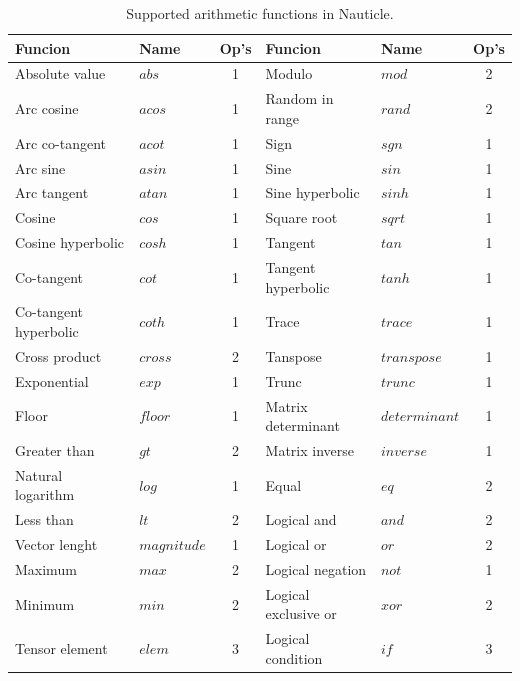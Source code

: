\documentclass[a4paper,12pt,openany]{book}
\theoremstyle{break}
\begin{document}
\begin{table}
\begin{center}
\caption{Supported arithmetic functions in Nauticle.}\label{tbl:arfc}
\begin{tabular}{ l l c | l l c }
\toprule[1.5pt]
\bf Funcion & \bf Name & \bf Op's & \bf Funcion & \bf Name & \bf Op's\\ 
\midrule
Absolute value & $abs$ & 1 & Modulo & $mod$ & 2 \\
Arc cosine & $acos$ & 1 & Random in range & $rand$ & 2 \\
Arc co-tangent & $acot$ & 1 & Sign & $sgn$ & 1 \\
Arc sine & $asin$ & 1 & Sine & $sin$ & 1 \\
Arc tangent & $atan$ & 1 & Sine hyperbolic & $sinh$ & 1 \\
Cosine & $cos$ & 1 & Square root & $sqrt$ & 1 \\
Cosine hyperbolic & $cosh$ & 1 & Tangent & $tan$ & 1 \\
Co-tangent & $cot$ & 1 & Tangent hyperbolic & $tanh$ & 1 \\
Co-tangent hyperbolic & $coth$ & 1 & Trace & $trace$ & 1 \\
Cross product & $cross$ & 2 & Tanspose & $transpose$ & 1 \\
Exponential & $exp$ & 1 & Trunc & $trunc$ & 1 \\
Floor & $floor$ & 1 & Matrix determinant & $determinant$ & 1 \\
Greater than & $gt$ & 2 & Matrix inverse & $inverse$ & 1 \\
Natural logarithm & $log$ & 1 & Equal & $eq$ & 2 \\
Less than & $lt$ & 2 & Logical and & $and$ & 2 \\
Vector lenght & $magnitude$ & 1 & Logical or & $or$ & 2 \\
Maximum & $max$ & 2 & Logical negation & $not$ & 1 \\
Minimum & $min$ & 2 & Logical exclusive or & $xor$ & 2 \\
Tensor element & $elem$ & 3 & Logical condition & $if$ & 3 \\
\bottomrule[1.25pt]
\end{tabular}
\end{center}
\end{table}
\end{document}
